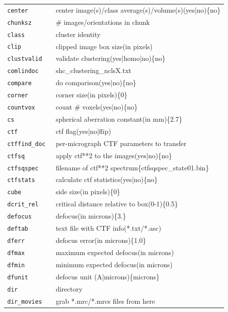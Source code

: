 \documentclass[a4paper,11pt]{article}
\begin{document}
\begin{tabular}{ll}
\texttt{center          }&{ center image(s)/class average(s)/volume(s)(yes|no)\{no\}}\\
\texttt{chunksz         }&{ \# images/orientations in chunk}\\
\texttt{class           }&{ cluster identity}\\
\texttt{clip            }&{ clipped image box size(in pixels)}\\
\texttt{clustvalid      }&{ validate clustering(yes|homo|no)\{no\}}\\
\texttt{comlindoc       }&{ shc\_clustering\_nclsX.txt}\\
\texttt{compare         }&{ do comparison(yes|no)\{no\}}\\
\texttt{corner          }&{ corner size(in pixels)\{0\}}\\
\texttt{countvox        }&{ count \# voxels(yes|no)\{no\}}\\
\texttt{cs              }&{ spherical aberration constant(in mm)\{2.7\}}\\
\texttt{ctf             }&{ ctf flag(yes|no|flip)}\\
\texttt{ctffind\_doc     }&{ per-micrograph CTF parameters to transfer}\\
\texttt{ctfsq           }&{ apply ctf**2 to the images(yes|no)\{no\}}\\
\texttt{ctfsqspec       }&{ filename of ctf**2 spectrum\{ctfsqspec\_state01.bin\}}\\
\texttt{ctfstats        }&{ calculate ctf statistics(yes|no)\{no\}}\\
\texttt{cube            }&{ side size(in pixels)\{0\}}\\
\texttt{dcrit\_rel       }&{ critical distance relative to box(0-1)\{0.5\}}\\
\texttt{defocus         }&{ defocus(in microns)\{3.\}}\\
\texttt{deftab          }&{ text file with CTF info(*.txt/*.asc)}\\
\texttt{dferr           }&{ defocus error(in microns)\{1.0\}}\\
\texttt{dfmax           }&{ maximum expected defocus(in microns)}\\
\texttt{dfmin           }&{ minimum expected defocus(in microns)}\\
\texttt{dfunit          }&{ defocus unit (A|microns)\{microns\}}\\
\texttt{dir             }&{ directory}\\
\texttt{dir\_movies      }&{ grab *.mrc/*.mrcs files from here}\\

\end{tabular}
\end{document}

